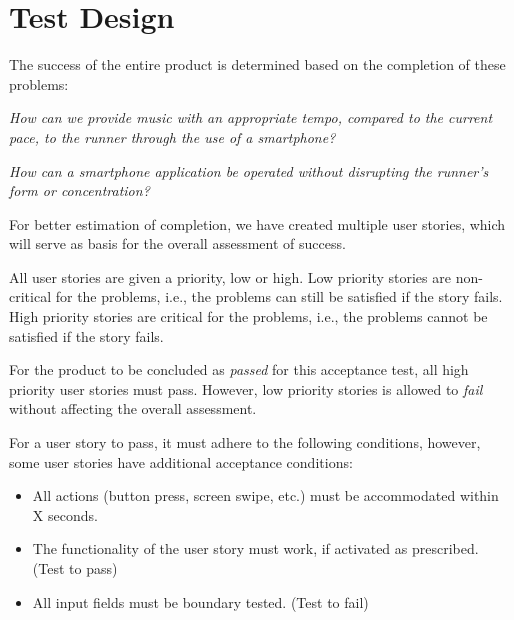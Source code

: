 \section{Test Design}
The success of the entire product is determined based on the completion of these problems: 

\begin{center}
\textit{How can we provide music with an appropriate tempo, compared to the current pace, to the runner through the use of a smartphone?}
\end{center}

\begin{center}
\textit{How can a smartphone application be operated without disrupting the runner's form or concentration?}
\end{center}

For better estimation of completion, we have created multiple user stories, which will serve as basis for the overall assessment of success.

All user stories are given a priority, low or high.
Low priority stories are non-critical for the problems, i.e., the problems can still be satisfied if the story fails. 
High priority stories are critical for the problems, i.e., the problems cannot be satisfied if the story fails. 

For the product to be concluded as \textit{passed} for this acceptance test, all high priority user stories must pass.
However, low priority stories is allowed to \textit{fail} without affecting the overall assessment.

\pagebreak
For a user story to pass, it must adhere to the following conditions, however, some user stories have additional acceptance conditions:
\begin{itemize}
\item All actions (button press, screen swipe, etc.) must be accommodated within X seconds.
\item The functionality of the user story must work, if activated as prescribed. (Test to pass)
\item All input fields must be boundary tested. (Test to fail)
\end{itemize}

